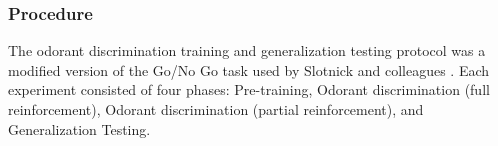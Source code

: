 \subsubsection*{Procedure}
\label{sec:methods_procedure}
The odorant discrimination training and generalization testing protocol was a modified version of the Go/No Go task used by Slotnick and colleagues \cite{18428626}. Each experiment consisted of four phases: Pre-training, Odorant discrimination (full reinforcement), Odorant discrimination (partial reinforcement), and Generalization Testing. 